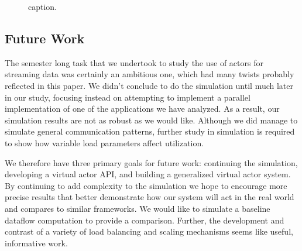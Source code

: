 \documentclass[conference,twocolumn,10pt]{IEEEtran}
\begin{document}
\begin{figure}[!t]
    \centering
    \hfil
    \hfil
    \caption{caption.}
    \label{fig:communications_patterns_simulations}
\end{figure}

\subsection{Future Work}

The semester long task that we undertook to study the use of actors for streaming data was certainly an ambitious one, which had many twists probably reflected in this paper. We didn't conclude to do the simulation until much later in our study, focusing instead on attempting to implement a parallel implementation of one of the applications we have analyzed. As a result, our simulation results are not as robust as we would like. Although we did manage to simulate general communication patterns, further study in simulation is required to show how variable load parameters affect utilization.

We therefore have three primary goals for future work: continuing the simulation, developing a virtual actor API, and building a generalized virtual actor system. By continuing to add complexity to the simulation we hope to encourage more precise results that better demonstrate how our system will act in the real world and compares to similar frameworks. We would like to simulate a baseline dataflow computation to provide a comparison. Further, the development and contrast of a variety of load balancing and scaling mechanisms seems like useful, informative work.
\end{document}
